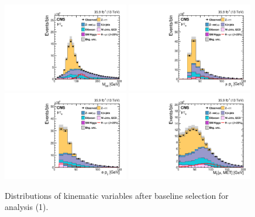\begin{figure}[!htpb]\centering
 \includegraphics[width=0.49\textwidth]{plots_and_figures/chapter5/preselection/Figure_002-a.pdf}
 \includegraphics[width=0.49\textwidth]{plots_and_figures/chapter5/preselection/Figure_002-b.pdf} \\
 \includegraphics[width=0.49\textwidth]{plots_and_figures/chapter5/preselection/Figure_002-c.pdf}
 \includegraphics[width=0.49\textwidth]{plots_and_figures/chapter5/preselection/Figure_002-d.pdf} 
\caption{Distributions of kinematic variables after baseline selection for \hmue analysis (1).}
 \label{fig:h125_presel1}
\end{figure}
